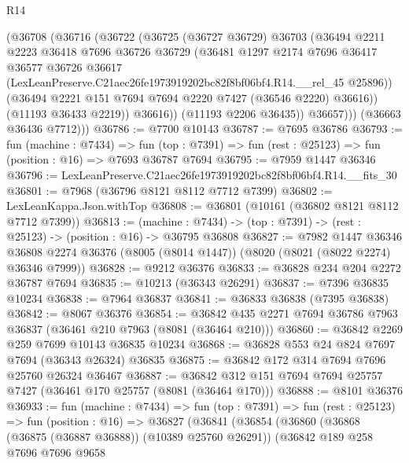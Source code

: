 \begin{lexlean}{R14}
\begin{coremodule}
              (@36708
                (@36716
                  (@36722
                    (@36725
                      (@36727 @36729)
                      @36703
                      (@36494
                        @2211
                        @2223
                        @36418
                        @7696
                        @36726
                        @36729
                        (@36481
                          @1297
                          @2174
                          @7696
                          @36417
                          @36577
                          @36726
                          @36617
                          (LexLeanPreserve.C21aec26fe1973919202bc82f8bf06bf4.R14.__rel_45 @25896))
                        (@36494 @2221 @151 @7694 @7694 @2220 @7427 (@36546 @2220) @36616))
                      (@11193 @36433 @2219))
                    @36616))
                (@11193 @2206 @36435))
              @36657)))
        (@36663 @36436 @7712)))
@36786 := @7700 @10143
@36787 := @7695 @36786
@36793 := fun (machine : @7434) =>
  fun (top : @7391) => fun (rest : @25123) => fun (position : @16) => @7693 @36787 @7694
@36795 := @7959 @1447 @36346
@36796 := LexLeanPreserve.C21aec26fe1973919202bc82f8bf06bf4.R14.__fits_30
@36801 := @7968 (@36796 @8121 @8112 @7712 @7399)
@36802 := LexLeanKappa.Json.withTop
@36808 := @36801 (@10161 (@36802 @8121 @8112 @7712 @7399))
@36813 := (machine : @7434) -> (top : @7391) -> (rest : @25123) -> (position : @16) -> @36795 @36808
@36827 := @7982
    @1447
    @36346
    @36808
    @2274
    @36376
    (@8005 (@8014 @1447))
    (@8020 (@8021 (@8022 @2274) @36346 @7999))
@36828 := @9212 @36376
@36833 := @36828 @234 @204 @2272 @36787 @7694
@36835 := @10213 (@36343 @26291)
@36837 := @7396 @36835 @10234
@36838 := @7964 @36837
@36841 := @36833 @36838 (@7395 @36838)
@36842 := @8067 @36376
@36854 := @36842 @435 @2271 @7694 @36786 @7963 @36837 (@36461 @210 @7963 (@8081 (@36464 @210)))
@36860 := @36842 @2269 @259 @7699 @10143 @36835 @10234
@36868 := @36828 @553 @24 @824 @7697 @7694 (@36343 @26324) @36835
@36875 := @36842 @172 @314 @7694 @7696 @25760 @26324 @36467
@36887 := @36842 @312 @151 @7694 @7694 @25757 @7427 (@36461 @170 @25757 (@8081 (@36464 @170)))
@36888 := @8101 @36376
@36933 := fun (machine : @7434) =>
  fun (top : @7391) =>
  fun (rest : @25123) =>
  fun (position : @16) =>
  @36827
    (@36841
      (@36854
        (@36860
          (@36868 (@36875 (@36887 @36888)) (@10389 @25760 @26291))
          (@36842
            @189
            @258
            @7696
            @7696
            @9658

\end{coremodule}
\end{lexlean}
